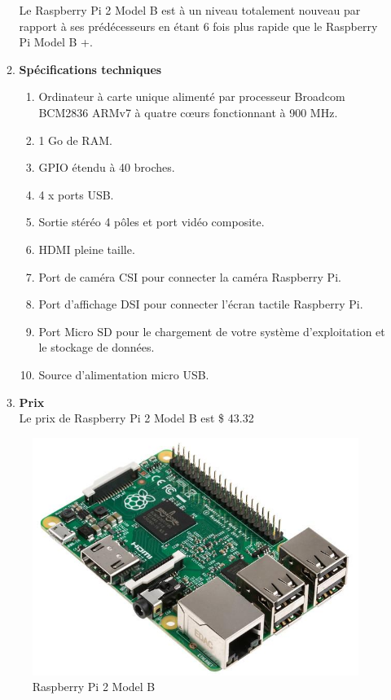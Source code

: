 \documentclass[12pt]{article}
\begin{document}
\begin{itemize}
\begin{enumerate}
		Le Raspberry Pi 2 Model B est à un niveau totalement nouveau par rapport à ses prédécesseurs en étant 6 fois plus rapide que le Raspberry Pi Model B +.
	\item \textbf{Spécifications techniques}\\
		\begin{enumerate}
			\item Ordinateur à carte unique alimenté par processeur Broadcom BCM2836 ARMv7 à quatre cœurs fonctionnant à 900 MHz.
			\item 1 Go de RAM.
			\item GPIO étendu à 40 broches.
			\item 4 x ports USB.
			\item Sortie stéréo 4 pôles et port vidéo composite.
			\item HDMI pleine taille.
			\item Port de caméra CSI pour connecter la caméra Raspberry Pi.
			\item Port d’affichage DSI pour connecter l’écran tactile Raspberry Pi.
			\item Port Micro SD pour le chargement de votre système d'exploitation et le stockage de données.
			\item Source d'alimentation micro USB.
\end{enumerate}
	\item \textbf{Prix}\\
	Le prix de Raspberry Pi 2 Model B est \$ 43.32
	
	\end{enumerate}
	\begin{figure}[h]
		\centernig
		\includegraphics[width=12cm]{img-Chapiter-3/raspbPi.jpg}
		\caption{Raspberry Pi 2 Model B}
	\end{figure}\\
	

\end{itemize}
\end{document}
